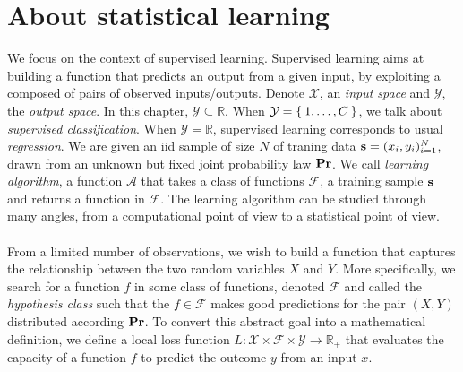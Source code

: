 
\section{About statistical learning}
\label{sec:about_statistical_learning}
We focus on the context of supervised learning. Supervised learning aims at
building a function that predicts an output from a given input, by exploiting a
 composed of pairs of observed inputs/outputs. Denote
$\mathcal{X}$, an \emph{input space} and $\mathcal{Y}$, the \emph{output
space}.  In this chapter, $\mathcal{Y} \subseteq \mathbb{R}$. When
$\mathcal{Y}=\Set{1, \ldots, C}$, we talk about \emph{supervised
classification}.  When $\mathcal{Y}=\mathbb{R}$, supervised learning
corresponds to  usual \emph{regression}. We are given an \acf{iid} sample of
size $N$ of traning data $\boldsymbol{\mathbf{s}}=(x_i, y_i)_{i=1}^N$, drawn from an unknown
but fixed joint probability law ${\mathbf{{Pr}}}$. We call \emph{learning
algorithm}, a function $\mathcal{A}$ that takes a class of functions
$\mathcal{F}$, a training sample $\boldsymbol{\mathbf{s}}$ and returns a function in
$\mathcal{F}$. The learning algorithm can be studied through many angles, from
a computational point of view to a statistical point of view.
\paragraph{}
From a limited number of observations, we wish to build a function that
captures the relationship between the two random variables $X$ and $Y$. More
specifically, we search for a function $f$ in some class of functions, denoted
$\mathcal{F}$ and called the \emph{hypothesis class} such that the
$f\in\mathcal{F}$ makes good predictions for the pair $(X,Y)$ distributed
according ${\mathbf{{Pr}}}$. To convert this abstract goal into a
mathematical definition, we define a local loss function
$L:\mathcal{X}\times\mathcal{F}\times\mathcal{Y} \to \mathbb{R}_+$ that
evaluates the capacity of a function $f$ to predict the outcome $y$ from an
input $x$.
